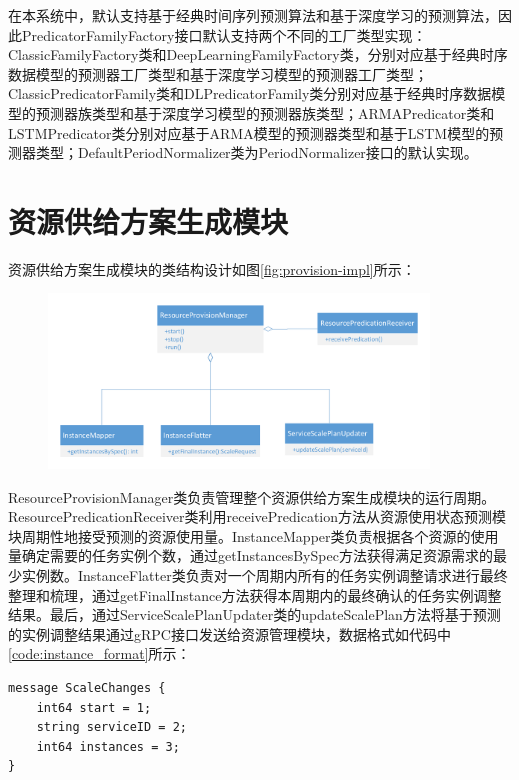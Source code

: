 在本系统中，默认支持基于经典时间序列预测算法和基于深度学习的预测算法，因此PredicatorFamilyFactory接口默认支持两个不同的工厂类型实现：ClassicFamilyFactory类和DeepLearningFamilyFactory类，分别对应基于经典时序数据模型的预测器工厂类型和基于深度学习模型的预测器工厂类型；ClassicPredicatorFamily类和DLPredicatorFamily类分别对应基于经典时序数据模型的预测器族类型和基于深度学习模型的预测器族类型；ARMAPredicator类和LSTMPredicator类分别对应基于ARMA模型的预测器类型和基于LSTM模型的预测器类型；DefaultPeriodNormalizer类为PeriodNormalizer接口的默认实现。

\section{资源供给方案生成模块}
资源供给方案生成模块的类结构设计如图\ref{fig:provision-impl}所示：
\begin{figure}[H]
\centering
\includegraphics[width=0.9\textwidth]{./figure/provision_impl}
\end{figure}

ResourceProvisionManager类负责管理整个资源供给方案生成模块的运行周期。ResourcePredicationReceiver类利用receivePredication方法从资源使用状态预测模块周期性地接受预测的资源使用量。InstanceMapper类负责根据各个资源的使用量确定需要的任务实例个数，通过getInstancesBySpec方法获得满足资源需求的最少实例数。InstanceFlatter类负责对一个周期内所有的任务实例调整请求进行最终整理和梳理，通过getFinalInstance方法获得本周期内的最终确认的任务实例调整结果。最后，通过ServiceScalePlanUpdater类的updateScalePlan方法将基于预测的实例调整结果通过gRPC接口发送给资源管理模块，数据格式如代码中\ref{code:instance_format}所示：
\begin{lstlisting}[language=protobuf3,style=protobuf, caption={资源使用状态监测数据},label={code:instance_format}]
message ScaleChanges {
    int64 start = 1;
    string serviceID = 2;
    int64 instances = 3;
}
\end{lstlisting}

